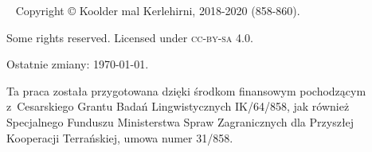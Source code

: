 ~\vfill
\begingroup
\setlength\parindent{0pt}\footnotesize
Copyright © Koolder mal Kerlehirni, 2018-2020 (858-860).

\bigskip

Some rights reserved. Licensed under \textsc{cc-by-sa} 4.0.

Ostatnie zmiany: \today{}.

\medskip

Ta praca została przygotowana dzięki środkom finansowym
pochodzącym z~Cesarskiego Grantu Badań Lingwistycznych IK/64/858,
jak również Specjalnego Funduszu Ministerstwa Spraw Zagranicznych dla
Przyszłej Kooperacji Terrańskiej, umowa numer 31/858.

\endgroup
